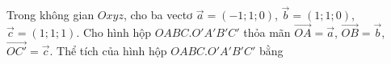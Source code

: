 \begin{ex}
Trong không gian $Oxyz$, cho ba vectơ $\vec a=(-1;1;0)$, $\vec b=(1;1;0)$, $\vec c=(1;1;1)$. Cho hình hộp $OABC.O'A'B'C'$ thỏa mãn $\overrightarrow{OA}=\vec a$, $\overrightarrow{OB}=\vec b$, $\overrightarrow{OC'}=\vec c$. Thể tích của hình hộp $OABC.O'A'B'C'$ bằng
\end{ex}
